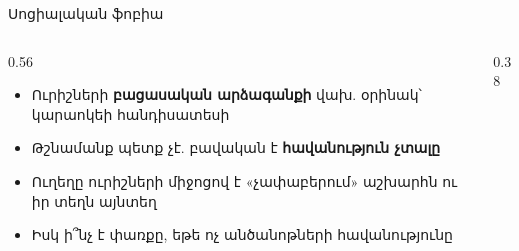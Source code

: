 \begin{frame}{Սոցիալական ֆոբիա}
  \begin{columns}[c]
    \begin{column}{0.56\textwidth}
      \begin{itemize}
        \item Ուրիշների \textbf{բացասական արձագանքի} վախ. օրինակ՝ կարաոկեի հանդիսատեսի
        \item<2-> Թշնամանք պետք չէ. բավական է \textbf{հավանություն չտալը}
        \item<3-> Ուղեղը ուրիշների միջոցով է «չափաբերում» աշխարհն ու իր տեղն այնտեղ
        \item<4-> Իսկ ի՞նչ է փառքը, եթե ոչ անծանոթների հավանությունը
      \end{itemize}
    \end{column}
    \begin{column}{0.38\textwidth}
      \centering
      \par\smallskip
    \end{column}
  \end{columns}
\end{frame}


